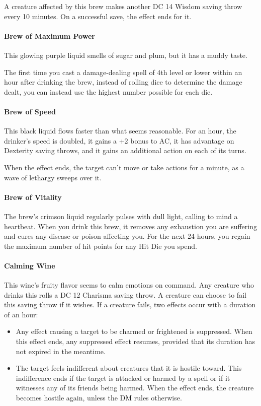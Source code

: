         A creature affected by this brew makes another DC 14 Wisdom saving throw every 10 minutes.
        On a successful save, the effect ends for it.
    \paragraph{Brew of Maximum Power}
        This glowing purple liquid smells of sugar and plum, but it has a muddy taste.

        The first time you cast a damage-dealing spell of 4th level or lower within an hour after drinking the brew, instead of rolling dice to determine the damage dealt, you can instead use the highest number possible for each die.
    \paragraph{Brew of Speed} %
        This black liquid flows faster than what seems reasonable.
        For an hour, the drinker's speed is doubled, it gains a +2 bonus to AC, it has advantage on Dexterity saving throws, and it gains an additional action on each of its turns.

        When the effect ends, the target can't move or take actions for a minute, as a wave of lethargy sweeps over it.
    \paragraph{Brew of Vitality} %
        The brew's crimson liquid regularly pulses with dull light, calling to mind a heartbeat.
        When you drink this brew, it removes any exhaustion you are suffering and cures any disease or poison affecting you.
        For the next 24 hours, you regain the maximum number of hit points for any Hit Die you spend.
    \paragraph{Calming Wine} %
        This wine's fruity flavor seems to calm emotions on command.
        Any creature who drinks this rolls a DC 12 Charisma saving throw.
        A creature can choose to fail this saving throw if it wishes.
        If a creature fails, two effects occur with a duration of an hour:
        \begin{itemize}
            \item Any effect causing a target to be charmed or frightened is suppressed.
            When this effect ends, any suppressed effect resumes, provided that its duration has not expired in the meantime.
            \item The target feels indifferent about creatures that it is hostile toward.
            This indifference ends if the target is attacked or harmed by a spell or if it witnesses any of its friends being harmed.
            When the effect ends, the creature becomes hostile again, unless the DM rules otherwise.
        \end{itemize}

